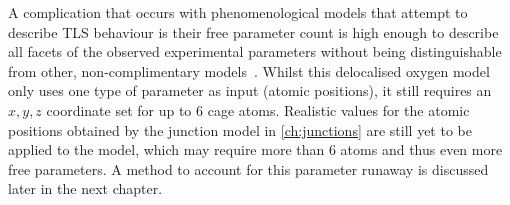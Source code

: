 A complication that occurs with phenomenological models that attempt to describe TLS behaviour is their free parameter count is high enough to describe all facets of the observed experimental parameters without being distinguishable from other, non-complimentary models~\cite{Cole2010}.
Whilst this delocalised oxygen model only uses one type of parameter as input (atomic positions), it still requires an $x, y, z$  coordinate set for up to $6$ cage atoms.
Realistic values for the atomic positions obtained by the junction model in \cref{ch:junctions} are still yet to be applied to the model, which may require more than $6$ atoms and thus even more free parameters.
A method to account for this parameter runaway is discussed later in the next chapter. 